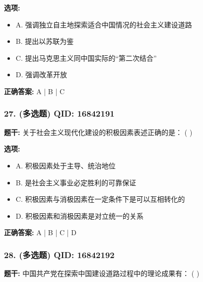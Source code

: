 \documentclass[12pt,UTF8]{ctexart}
\begin{document}
\textbf{选项:}
\begin{itemize}[leftmargin=*]

  \item A. 强调独立自主地探索适合中国情况的社会主义建设道路

  \item B. 提出以苏联为鉴

  \item C. 提出马克思主义同中国实际的“第二次结合”

  \item D. 强调改革开放

\end{itemize}

\textbf{正确答案:}
A | B | C

\vspace{0.3em}\hrulefill\vspace{0.7em}

\subsubsection*{27. (多选题) \small QID: 16842191}

\textbf{题干:}
关于社会主义现代化建设的积极因素表述正确的是： ( )

\textbf{选项:}
\begin{itemize}[leftmargin=*]

  \item A. 积极因素处于主导、统治地位

  \item B. 是社会主义事业必定胜利的可靠保证

  \item C. 积极因素与消极因素在一定条件下是可以互相转化的

  \item D. 积极因素和消极因素是对立统一的关系

\end{itemize}

\textbf{正确答案:}
A | B | C | D

\vspace{0.3em}\hrulefill\vspace{0.7em}

\subsubsection*{28. (多选题) \small QID: 16842192}

\textbf{题干:}
中国共产党在探索中国建设道路过程中的理论成果有： ( )
\end{document}
